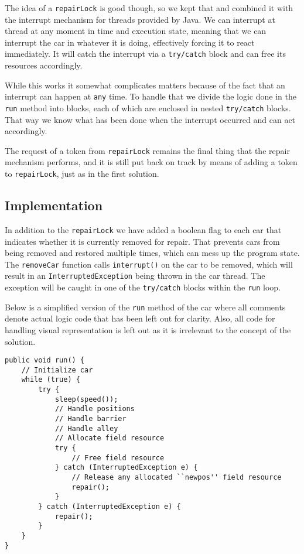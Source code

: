 The idea of a \texttt{repairLock} is good though, so we kept that and combined it with the interrupt mechanism for threads provided by Java. We can interrupt at thread at any moment in time and execution state, meaning that we can interrupt the car in whatever it is doing, effectively forcing it to react immediately. It will catch the interrupt via a \texttt{try/catch} block and can free its resources accordingly.

While this works it somewhat complicates matters because of the fact that an interrupt can happen at \texttt{any} time. To handle that we divide the logic done in the \texttt{run} method into blocks, each of which are enclosed in nested \texttt{try/catch} blocks. That way we know what has been done when the interrupt occurred and can act accordingly.

The request of a token from \texttt{repairLock} remains the final thing that the repair mechanism performs, and it is still put back on track by means of adding a token to \texttt{repairLock}, just as in the first solution.

\subsection{Implementation}
In addition to the \texttt{repairLock} we have added a boolean flag to each car that indicates whether it is currently removed for repair. That prevents cars from being removed and restored multiple times, which can mess up the program state. The \texttt{removeCar} function calls \texttt{interrupt()} on the car to be removed, which will result in an \texttt{InterruptedException} being thrown in the car thread. The exception will be caught in one of the \texttt{try/catch} blocks within the \texttt{run} loop.

Below is a simplified version of the \texttt{run} method of the car where all comments denote actual logic code that has been left out for clarity. Also, all code for handling visual representation is left out as it is irrelevant to the concept of the solution.

\begin{lstlisting}
public void run() {
	// Initialize car
	while (true) {
		try {
			sleep(speed());
			// Handle positions
			// Handle barrier
			// Handle alley
			// Allocate field resource
			try {
				// Free field resource
			} catch (InterruptedException e) {
				// Release any allocated ``newpos'' field resource
				repair();
			}
		} catch (InterruptedException e) {
			repair();
		}
	}
}
\end{lstlisting}

